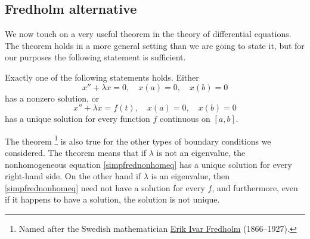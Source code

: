 \documentclass{ximera}
\begin{document}
%



\subsection{Fredholm alternative}

We now touch on a very useful theorem in the theory of differential equations.  The theorem holds in a more general setting than we are going to state it, but for our purposes the following statement is sufficient.  %

\begin{theorem}%
\label{thm:fredholmsimple} 
Exactly one of the following statements holds. Either
\begin{equation} \label{simpfredhomeq}
    x'' + \lambda x = 0, \quad x(a) = 0, \quad x(b) = 0
\end{equation}
has a nonzero solution, or
\begin{equation} \label{simpfrednonhomeq}
    x'' + \lambda x = f(t), \quad x(a) = 0, \quad x(b) = 0
\end{equation}
has a unique solution for every function $f$ continuous on $[a,b]$.
\end{theorem}

The theorem%
\footnote{Named after the Swedish mathematician \href{https://en.wikipedia.org/wiki/Fredholm}{Erik Ivar Fredholm} (1866--1927).} 
is also true for the other types of boundary conditions we considered. The theorem means that if $\lambda$ is not an eigenvalue, the nonhomogeneous equation \eqref{simpfrednonhomeq} has a unique solution for every right-hand side.  On the other hand if $\lambda$ is an eigenvalue, then  \eqref{simpfrednonhomeq} need not have a solution for every $f$, and furthermore, even if it happens to have a solution, the solution is not unique.
\end{document}
